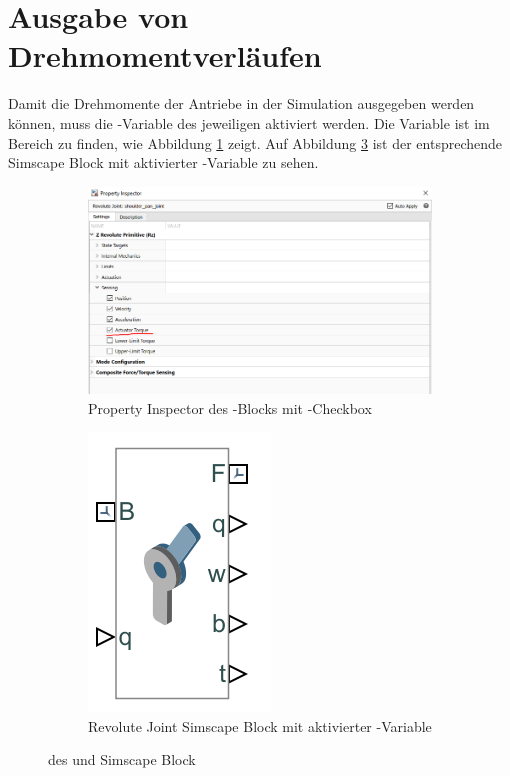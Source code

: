 \section{Ausgabe von Drehmomentverläufen}

Damit die Drehmomente der Antriebe in der Simulation ausgegeben werden können, muss die -Variable des jeweiligen  aktiviert werden. 
Die Variable ist im Bereich  zu finden, wie Abbildung \ref{fig:simscape_revolute_joint_checkbox} zeigt.
Auf Abbildung \ref{fig:simscape_revolute_joint_block} ist der entsprechende Simscape Block mit aktivierter -Variable zu sehen.
\noindent
\\[3cm]
\vspace{-3cm}

\begin{figure}
	\centering
	\begin{subfigure}[b]{0.5\textwidth}
		\centering
		\includegraphics[width=1.0\linewidth]{grafic/actuator_torque}
	\caption{Property Inspector des -Blocks mit -Checkbox}
	\label{fig:simscape_revolute_joint_checkbox}
	\end{subfigure}
	\begin{subfigure}[b]{0.39\textwidth}
		\centering
		\includegraphics[width=0.3\linewidth]{grafic/revolute_joint}
		\caption{Revolute Joint Simscape Block mit aktivierter -Variable}
		\label{fig:simscape_revolute_joint_block}
	\end{subfigure}
	\caption{ des  und Simscape Block}
\end{figure}

